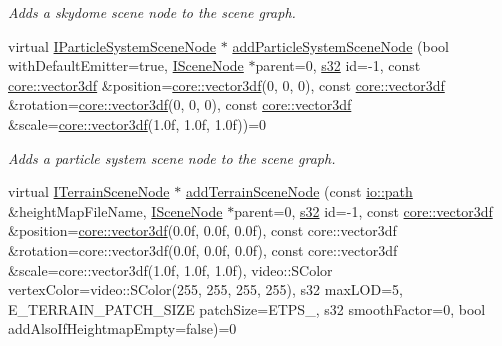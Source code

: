 \begin{DoxyCompactItemize}
\begin{DoxyCompactList}\small\item\em Adds a skydome scene node to the scene graph. \end{DoxyCompactList}\item 
virtual \hyperlink{classirr_1_1scene_1_1IParticleSystemSceneNode}{I\+Particle\+System\+Scene\+Node} $\ast$ \hyperlink{classirr_1_1scene_1_1ISceneManager_a1c1c2b024a01bd1d6d56518926e37fa8}{add\+Particle\+System\+Scene\+Node} (bool with\+Default\+Emitter=true, \hyperlink{classirr_1_1scene_1_1ISceneNode}{I\+Scene\+Node} $\ast$parent=0, \hyperlink{namespaceirr_ac66849b7a6ed16e30ebede579f9b47c6}{s32} id=-\/1, const \hyperlink{namespaceirr_1_1core_ae6e2b2a6c552833ebbd5b7463d03586b}{core\+::vector3df} \&position=\hyperlink{namespaceirr_1_1core_ae6e2b2a6c552833ebbd5b7463d03586b}{core\+::vector3df}(0, 0, 0), const \hyperlink{namespaceirr_1_1core_ae6e2b2a6c552833ebbd5b7463d03586b}{core\+::vector3df} \&rotation=\hyperlink{namespaceirr_1_1core_ae6e2b2a6c552833ebbd5b7463d03586b}{core\+::vector3df}(0, 0, 0), const \hyperlink{namespaceirr_1_1core_ae6e2b2a6c552833ebbd5b7463d03586b}{core\+::vector3df} \&scale=\hyperlink{namespaceirr_1_1core_ae6e2b2a6c552833ebbd5b7463d03586b}{core\+::vector3df}(1.\+0f, 1.\+0f, 1.\+0f))=0
\begin{DoxyCompactList}\small\item\em Adds a particle system scene node to the scene graph. \end{DoxyCompactList}\item 
virtual \hyperlink{classirr_1_1scene_1_1ITerrainSceneNode}{I\+Terrain\+Scene\+Node} $\ast$ \hyperlink{classirr_1_1scene_1_1ISceneManager_a2188fb0443c7e0b6b69a673ca1d9ca5c}{add\+Terrain\+Scene\+Node} (const \hyperlink{namespaceirr_1_1io_a6468281622ce3a1c46b72e19f32dded5}{io\+::path} \&height\+Map\+File\+Name, \hyperlink{classirr_1_1scene_1_1ISceneNode}{I\+Scene\+Node} $\ast$parent=0, \hyperlink{namespaceirr_ac66849b7a6ed16e30ebede579f9b47c6}{s32} id=-\/1, const \hyperlink{namespaceirr_1_1core_ae6e2b2a6c552833ebbd5b7463d03586b}{core\+::vector3df} \&position=\hyperlink{namespaceirr_1_1core_ae6e2b2a6c552833ebbd5b7463d03586b}{core\+::vector3df}(0.\+0f, 0.\+0f, 0.\+0f), const core\+::vector3df \&rotation=core\+::vector3df(0.\+0f, 0.\+0f, 0.\+0f), const core\+::vector3df \&scale=core\+::vector3df(1.\+0f, 1.\+0f, 1.\+0f), video\+::\+S\+Color vertex\+Color=video\+::\+S\+Color(255, 255, 255, 255), s32 max\+L\+O\+D=5, E\+\_\+\+T\+E\+R\+R\+A\+I\+N\+\_\+\+P\+A\+T\+C\+H\+\_\+\+S\+I\+Z\+E patch\+Size=\+E\+T\+P\+S\+\_, s32 smooth\+Factor=0, bool add\+Also\+If\+Heightmap\+Empty=false)=0

\end{DoxyCompactItemize}
